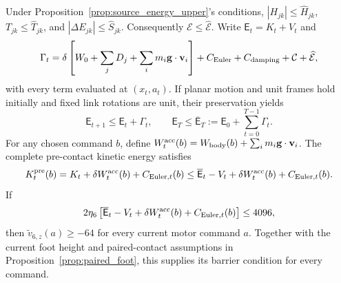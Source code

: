 \begin{proposition}
\label{prop:current_energy}
Under Proposition~\ref{prop:source_energy_upper}'s conditions,
$|H_{jk}|\le\widehat H_{jk}$, $T_{jk}\le\widehat T_{jk}$, and $|\Delta E_{jk}|\le\widehat S_{jk}$.
Consequently $\mathcal E\le\widehat{\mathcal E}$.
Write $\mathsf E_t=K_t+V_t$ and
\begin{equation}
 \Gamma_t=\delta\left[W_0+\sum_jD_j+\sum_im_i\mathbf g\cdot\mathbf v_i\right]
 +C_{\rm Euler}+C_{\rm damping}+\mathcal C+\widehat{\mathcal E},
 \label{eq:current_energy_gain}
\end{equation}
with every term evaluated at $(x_t,a_t)$.
If planar motion and unit frames hold initially and fixed link rotations are unit, their preservation yields
\begin{equation}
 \mathsf E_{t+1}\le\mathsf E_t+\Gamma_t,
 \qquad \mathsf E_T\le\overline{\mathsf E}_T:=\mathsf E_0+\sum_{t=0}^{T-1}\Gamma_t.
 \label{eq:current_energy_prefix}
\end{equation}
For any chosen command $b$, define $W_t^{\rm acc}(b)=W_{\rm body}(b)+\sum_im_i\mathbf g\cdot\mathbf v_i$.
The complete pre-contact kinetic energy satisfies
\begin{equation}
 K_t^{\rm pre}(b)=K_t+\delta W_t^{\rm acc}(b)+C_{{\rm Euler},t}(b)
 \le\overline{\mathsf E}_t-V_t+\delta W_t^{\rm acc}(b)+C_{{\rm Euler},t}(b).
 \label{eq:pre_kinetic_upper}
\end{equation}
If
\begin{equation}
 2\eta_6\left[\overline{\mathsf E}_t-V_t+
 \delta W_t^{\rm acc}(b)+C_{{\rm Euler},t}(b)\right]\le4096,
 \label{eq:kinetic_speed_certificate}
\end{equation}
then $\widetilde v_{6,z}(a)\ge-64$ for every current motor command $a$.
Together with the current foot height and paired-contact assumptions in Proposition~\ref{prop:paired_foot}, this supplies its barrier condition for every command.
\end{proposition}

